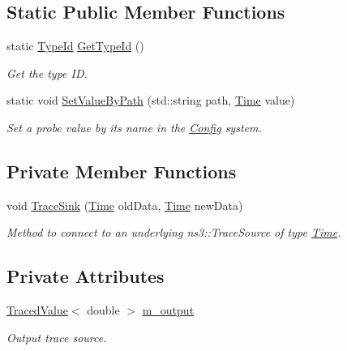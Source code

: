 \subsection*{Static Public Member Functions}
\begin{DoxyCompactItemize}
\item 
static \hyperlink{classns3_1_1TypeId}{Type\+Id} \hyperlink{classns3_1_1TimeProbe_a3eb8e61771557e9b58ea514f2bc54ce5}{Get\+Type\+Id} ()
\begin{DoxyCompactList}\small\item\em Get the type ID. \end{DoxyCompactList}\item 
static void \hyperlink{classns3_1_1TimeProbe_adffe9cb8b3c6de53b5d01fa08239731d}{Set\+Value\+By\+Path} (std\+::string path, \hyperlink{classns3_1_1Time}{Time} value)
\begin{DoxyCompactList}\small\item\em Set a probe value by its name in the \hyperlink{namespacens3_1_1Config}{Config} system. \end{DoxyCompactList}\end{DoxyCompactItemize}
\subsection*{Private Member Functions}
\begin{DoxyCompactItemize}
\item 
void \hyperlink{classns3_1_1TimeProbe_ac9f1814c0ed93f901d67fe6a08f0a7f4}{Trace\+Sink} (\hyperlink{classns3_1_1Time}{Time} old\+Data, \hyperlink{classns3_1_1Time}{Time} new\+Data)
\begin{DoxyCompactList}\small\item\em Method to connect to an underlying ns3\+::\+Trace\+Source of type \hyperlink{classns3_1_1Time}{Time}. \end{DoxyCompactList}\end{DoxyCompactItemize}
\subsection*{Private Attributes}
\begin{DoxyCompactItemize}
\item 
\hyperlink{classns3_1_1TracedValue}{Traced\+Value}$<$ double $>$ \hyperlink{classns3_1_1TimeProbe_abbc3ed620512e2f8ca1c180727206e4e}{m\+\_\+output}
\begin{DoxyCompactList}\small\item\em Output trace source. \end{DoxyCompactList}\end{DoxyCompactItemize}
